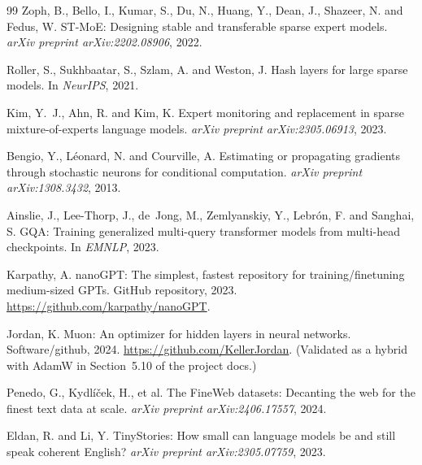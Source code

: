\documentclass[11pt]{article}
\begin{document}
\begin{thebibliography}{99}
Zoph, B., Bello, I., Kumar, S., Du, N., Huang, Y., Dean, J., Shazeer, N. and
Fedus, W.
\newblock ST-MoE: Designing stable and transferable sparse expert models.
\newblock \emph{arXiv preprint arXiv:2202.08906}, 2022.

Roller, S., Sukhbaatar, S., Szlam, A. and Weston, J.
\newblock Hash layers for large sparse models.
\newblock In \emph{NeurIPS}, 2021.

Kim, Y.~J., Ahn, R. and Kim, K.
\newblock Expert monitoring and replacement in sparse mixture-of-experts
language models.
\newblock \emph{arXiv preprint arXiv:2305.06913}, 2023.

Bengio, Y., L\'eonard, N. and Courville, A.
\newblock Estimating or propagating gradients through stochastic neurons for
conditional computation.
\newblock \emph{arXiv preprint arXiv:1308.3432}, 2013.

Ainslie, J., Lee-Thorp, J., de~Jong, M., Zemlyanskiy, Y., Lebr\'on, F. and
Sanghai, S.
\newblock GQA: Training generalized multi-query transformer models from
multi-head checkpoints.
\newblock In \emph{EMNLP}, 2023.

Karpathy, A.
\newblock nanoGPT: The simplest, fastest repository for training/finetuning
medium-sized GPTs.
\newblock GitHub repository, 2023. \url{https://github.com/karpathy/nanoGPT}.

Jordan, K.
\newblock Muon: An optimizer for hidden layers in neural networks.
\newblock Software/github, 2024. \url{https://github.com/KellerJordan}.
\newblock (Validated as a hybrid with AdamW in Section~5.10 of the project docs.)

Penedo, G., Kydl\'i\v{c}ek, H., {et al.}
\newblock The FineWeb datasets: Decanting the web for the finest text data at
scale.
\newblock \emph{arXiv preprint arXiv:2406.17557}, 2024.

Eldan, R. and Li, Y.
\newblock TinyStories: How small can language models be and still speak coherent
English?
\newblock \emph{arXiv preprint arXiv:2305.07759}, 2023.

\end{thebibliography}
\end{document}
